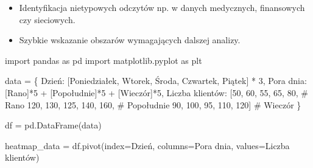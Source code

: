 \documentclass[
  polish,
  letterpaper,
  DIV=11,
  numbers=noendperiod]{scrreprt}
\newenvironment{Shaded}{\begin{snugshade}}{\end{snugshade}}
\newcommand{\CommentTok}[1]{\textcolor[rgb]{0.37,0.37,0.37}{#1}}
\newcommand{\DecValTok}[1]{\textcolor[rgb]{0.68,0.00,0.00}{#1}}
\newcommand{\ImportTok}[1]{\textcolor[rgb]{0.00,0.46,0.62}{#1}}
\newcommand{\NormalTok}[1]{\textcolor[rgb]{0.00,0.23,0.31}{#1}}
\newcommand{\OperatorTok}[1]{\textcolor[rgb]{0.37,0.37,0.37}{#1}}
\newcommand{\StringTok}[1]{\textcolor[rgb]{0.13,0.47,0.30}{#1}}
\providecommand{\tightlist}{%
  \setlength{\itemsep}{0pt}\setlength{\parskip}{0pt}}
\begin{document}
\begin{enumerate}
  \begin{itemize}
  \tightlist
  \item
    Identyfikacja nietypowych odczytów np. w danych medycznych,
    finansowych czy sieciowych.\\
  \item
    Szybkie wskazanie obszarów wymagających dalszej analizy.
  \end{itemize}
\end{enumerate}

\begin{Shaded}
\begin{Highlighting}[]
\ImportTok{import}\NormalTok{ pandas }\ImportTok{as}\NormalTok{ pd}
\ImportTok{import}\NormalTok{ matplotlib.pyplot }\ImportTok{as}\NormalTok{ plt}

\NormalTok{data }\OperatorTok{=}\NormalTok{ \{}
    \StringTok{\textquotesingle{}Dzień\textquotesingle{}}\NormalTok{: [}\StringTok{\textquotesingle{}Poniedziałek\textquotesingle{}}\NormalTok{, }\StringTok{\textquotesingle{}Wtorek\textquotesingle{}}\NormalTok{, }\StringTok{\textquotesingle{}Środa\textquotesingle{}}\NormalTok{, }\StringTok{\textquotesingle{}Czwartek\textquotesingle{}}\NormalTok{, }\StringTok{\textquotesingle{}Piątek\textquotesingle{}}\NormalTok{] }\OperatorTok{*} \DecValTok{3}\NormalTok{,}
    \StringTok{\textquotesingle{}Pora dnia\textquotesingle{}}\NormalTok{: [}\StringTok{\textquotesingle{}Rano\textquotesingle{}}\NormalTok{]}\OperatorTok{*}\DecValTok{5} \OperatorTok{+}\NormalTok{ [}\StringTok{\textquotesingle{}Popołudnie\textquotesingle{}}\NormalTok{]}\OperatorTok{*}\DecValTok{5} \OperatorTok{+}\NormalTok{ [}\StringTok{\textquotesingle{}Wieczór\textquotesingle{}}\NormalTok{]}\OperatorTok{*}\DecValTok{5}\NormalTok{,}
    \StringTok{\textquotesingle{}Liczba klientów\textquotesingle{}}\NormalTok{: [}\DecValTok{50}\NormalTok{, }\DecValTok{60}\NormalTok{, }\DecValTok{55}\NormalTok{, }\DecValTok{65}\NormalTok{, }\DecValTok{80}\NormalTok{,    }\CommentTok{\# Rano}
                        \DecValTok{120}\NormalTok{, }\DecValTok{130}\NormalTok{, }\DecValTok{125}\NormalTok{, }\DecValTok{140}\NormalTok{, }\DecValTok{160}\NormalTok{,  }\CommentTok{\# Popołudnie}
                        \DecValTok{90}\NormalTok{, }\DecValTok{100}\NormalTok{, }\DecValTok{95}\NormalTok{, }\DecValTok{110}\NormalTok{, }\DecValTok{120}\NormalTok{]    }\CommentTok{\# Wieczór}
\NormalTok{\}}

\NormalTok{df }\OperatorTok{=}\NormalTok{ pd.DataFrame(data)}


\NormalTok{heatmap\_data }\OperatorTok{=}\NormalTok{ df.pivot(index}\OperatorTok{=}\StringTok{\textquotesingle{}Dzień\textquotesingle{}}\NormalTok{, columns}\OperatorTok{=}\StringTok{\textquotesingle{}Pora dnia\textquotesingle{}}\NormalTok{, values}\OperatorTok{=}\StringTok{\textquotesingle{}Liczba klientów\textquotesingle{}}\NormalTok{)}


\end{Highlighting}
\end{Shaded}
\end{document}
